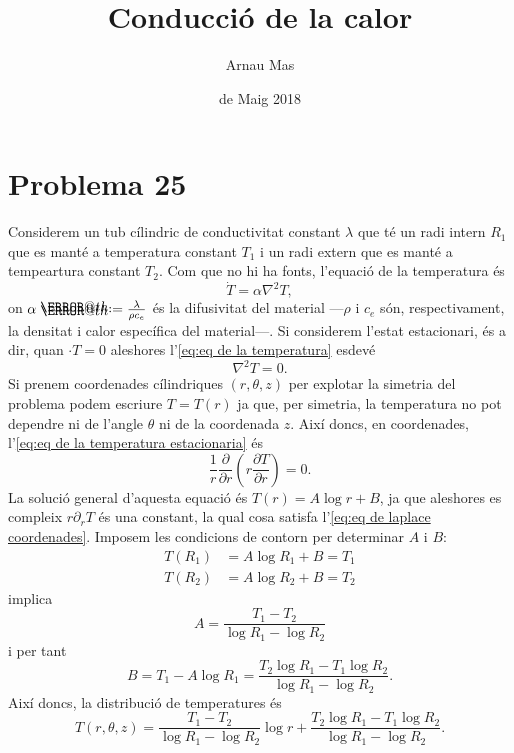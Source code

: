 \documentclass[12pt]{article}
\title{\sffamily {\bfseries Entrega 3:} Conducció de la calor}
\author{\sffamily Arnau Mas}
\date{\sffamily 4 de Maig 2018}
\makeatletter
\newcommand*{\defeq}{\mathrel{\rlap{%
    \raisebox{0.3ex}{$\m@th\cdot$}}%
  \raisebox{-0.3ex}{$\m@th\cdot$}}%
=}
\makeatother
\begin{document}
\maketitle

\section*{Problema 25}
Considerem un tub cílindric de conductivitat constant \( \lambda \) que té un radi intern \( R_1 \) que es manté a temperatura constant \( T_1 \) i un radi extern que es manté a tempeartura constant \( T_2 \). Com que no hi ha fonts, l'equació de la temperatura és  
\begin{equation} \label{eq:eq de la temperatura}
\dot{T} = \alpha \nabla^2 T,
\end{equation}
on \( \alpha \defeq \frac{\lambda}{\rho c_e} \) és la difusivitat del material ---\( \rho \) i \( c_e \) són, respectivament, la densitat i calor específica del material---. Si considerem l'estat estacionari, és a dir, quan \( \cdot{T} = 0 \) aleshores l'\cref{eq:eq de la temperatura} esdevé
\begin{equation} \label{eq:eq de la temperatura estacionaria}
	\nabla^2 T = 0. 
\end{equation}
Si prenem coordenades cílindriques \( (r, \theta, z) \) per explotar la simetria del problema podem escriure \( T = T(r) \) ja que, per simetria, la temperatura no pot dependre ni de l'angle \( \theta \) ni de la coordenada \( z \). Així doncs, en coordenades, l'\cref{eq:eq de la temperatura estacionaria} és
\begin{equation} \label{eq:eq de laplace coordenades}
	\frac{1}{r} \frac{\partial}{\partial r} \left( r \frac{\partial T}{\partial r} \right) = 0. 
\end{equation}
La solució general d'aquesta equació és \( T(r) = A\log{r} + B \), ja que aleshores es compleix \( r \partial_rT \) és una constant, la qual cosa satisfa l'\cref{eq:eq de laplace coordenades}. Imposem les condicions de contorn per determinar \( A \) i \( B \):
\begin{align*}
	T(R_1) &= A\log{R_1} + B = T_1 \\
	T(R_2) &= A\log{R_2} + B = T_2 
\end{align*}
implica
\begin{equation*}
 	A = \frac{T_1 - T_2}{\log{R_1} - \log{R_2}} 
\end{equation*}
i per tant
\begin{equation*}
B = T_1 - A\log{R_1} = \frac{T_2 \log{R_1} - T_1 \log{R_2}}{\log{R_1} - \log{R_2}}. 
\end{equation*}
Així doncs, la distribució de temperatures és
\begin{equation} \label{eq:distribucio de temperatura}
	T(r,\theta,z) = \frac{T_1 - T_2}{\log{R_1} - \log{R_2}}\log{r} + \frac{T_2 \log{R_1} - T_1 \log{R_2}}{\log{R_1} - \log{R_2}}. 
\end{equation}
\end{document}
